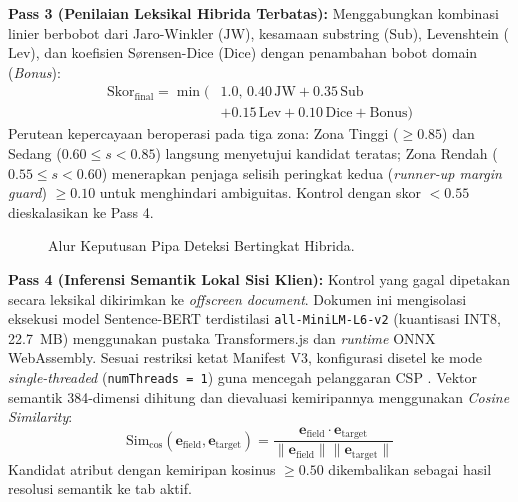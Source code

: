 \documentclass[conference]{IEEEtran}
\begin{document}
\textbf{Pass 3 (Penilaian Leksikal Hibrida Terbatas):} Menggabungkan kombinasi linier berbobot dari Jaro-Winkler ($\text{JW}$), kesamaan substring ($\text{Sub}$), Levenshtein ($\text{Lev}$), dan koefisien S{\o}rensen-Dice ($\text{Dice}$) dengan penambahan bobot domain (\textit{Bonus}):
\begin{align}
\text{Skor}_{\text{final}} = \min \bigl( & 1.0, \, 0.40\,\text{JW} + 0.35\,\text{Sub} \nonumber \\
& + 0.15\,\text{Lev} + 0.10\,\text{Dice} + \text{Bonus} \bigr) \label{eq:hybrid_score}
\end{align}
Perutean kepercayaan beroperasi pada tiga zona: Zona Tinggi ($\ge 0.85$) dan Sedang ($0.60 \le s < 0.85$) langsung menyetujui kandidat teratas; Zona Rendah ($0.55 \le s < 0.60$) menerapkan penjaga selisih peringkat kedua (\textit{runner-up margin guard}) $\ge 0.10$ untuk menghindari ambiguitas. Kontrol dengan skor $<0.55$ dieskalasikan ke Pass 4.

\begin{figure}[!htbp]
\centering
{}
\caption{Alur Keputusan Pipa Deteksi Bertingkat Hibrida.}
\label{fig:hybrid_cascade}
\end{figure}

\textbf{Pass 4 (Inferensi Semantik Lokal Sisi Klien):} Kontrol yang gagal dipetakan secara leksikal dikirimkan ke \textit{offscreen document}. Dokumen ini mengisolasi eksekusi model Sentence-BERT \cite{Reimers2019} terdistilasi \texttt{all-MiniLM-L6-v2} (kuantisasi INT8, 22.7~MB) \cite{minilm} menggunakan pustaka Transformers.js dan \textit{runtime} ONNX WebAssembly. Sesuai restriksi ketat Manifest V3, konfigurasi disetel ke mode \textit{single-threaded} (\texttt{numThreads = 1}) guna mencegah pelanggaran CSP \cite{W3C2024WebExtensions}. Vektor semantik 384-dimensi dihitung dan dievaluasi kemiripannya menggunakan \textit{Cosine Similarity}:
\begin{equation}
\text{Sim}_{\text{cos}}(\mathbf{e}_{\text{field}}, \mathbf{e}_{\text{target}}) = \frac{\mathbf{e}_{\text{field}} \cdot \mathbf{e}_{\text{target}}}{\|\mathbf{e}_{\text{field}}\| \|\mathbf{e}_{\text{target}}\|}
\label{eq:cosine_sim}
\end{equation}
Kandidat atribut dengan kemiripan kosinus $\ge 0.50$ dikembalikan sebagai hasil resolusi semantik ke tab aktif.
\end{document}
